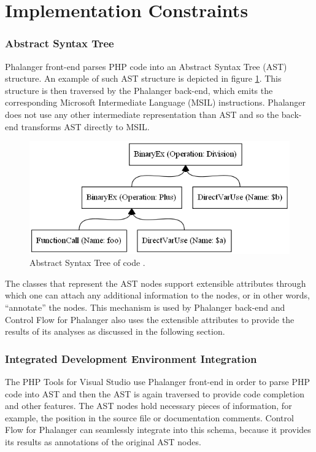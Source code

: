     \section{Implementation Constraints}
    
    \subsubsection*{Abstract Syntax Tree}     
    Phalanger front-end parses PHP code into an Abstract 
    Syntax Tree (AST) \cite{aho1985compilers} structure. 
    An example of such AST structure is depicted in 
    figure \ref{estexample}. This structure is then traversed 
    by the Phalanger back-end, which emits the 
    corresponding Microsoft Intermediate Language 
    (MSIL) instructions. Phalanger does not use any other 
    intermediate representation than AST and so the back-end 
    transforms AST directly to MSIL.
    
\begin{figure}[h]  
  \centering
    \includegraphics*[scale=0.5]{graphs/evaltree-ast.png}  
    \caption{Abstract Syntax Tree of code .\label{estexample}}
\end{figure}      
    
    The classes that represent the AST nodes support extensible 
    attributes through which one can attach any additional 
    information to the nodes, or in other words, ``annotate'' the nodes. 
    This mechanism is used by Phalanger back-end and 
    Control Flow for Phalanger also uses the extensible 
    attributes to provide the results 
    of its analyses as discussed in the following section.
    
    \subsubsection*{Integrated Development Environment Integration}
    The PHP Tools for Visual Studio use Phalanger 
    front-end in order to parse PHP code into AST 
    and then the AST is again traversed to provide 
    code completion and other features. The AST nodes 
    hold necessary pieces of information, for example, 
    the position in the source file or documentation comments.
    Control Flow for Phalanger can seamlessly integrate 
    into this schema, because it provides its results 
    as annotations of the original AST nodes.
    
